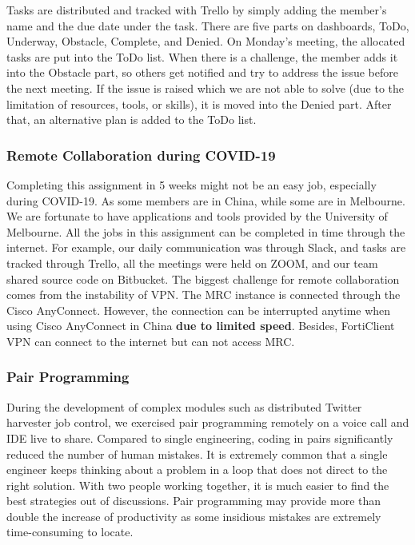 Tasks are distributed and tracked with Trello by simply adding the member's name and the due date under the task. There are five parts on dashboards, ToDo, Underway, Obstacle, Complete, and Denied. On Monday’s meeting, the allocated tasks are put into the ToDo list. When there is a challenge, the member adds it into the Obstacle part, so others get notified and try to address the issue before the next meeting. If the issue is raised which we are not able to solve (due to the limitation of resources, tools, or skills), it is moved into the Denied part. After that, an alternative plan is added to the ToDo list.

\subsubsection{Remote Collaboration during COVID-19}

Completing this assignment in 5 weeks might not be an easy job, especially during COVID-19. As some members are in China, while some are in Melbourne. We are fortunate to have applications and tools provided by the University of Melbourne. All the jobs in this assignment can be completed in time through the internet. For example, our daily communication was through Slack, and tasks are tracked through Trello, all the meetings were held on ZOOM, and our team shared source code on Bitbucket. The biggest challenge for remote collaboration comes from the instability of VPN. The MRC instance is connected through the Cisco AnyConnect. However, the connection can be interrupted anytime when using Cisco AnyConnect in China \textbf{due to limited speed}. Besides, FortiClient VPN can connect to the internet but can not access MRC.

\subsubsection{Pair Programming}

During the development of complex modules such as distributed Twitter harvester job control, we exercised pair programming remotely on a voice call and IDE live to share. Compared to single engineering, coding in pairs significantly reduced the number of human mistakes. It is extremely common that a single engineer keeps thinking about a problem in a loop that does not direct to the right solution. With two people working together, it is much easier to find the best strategies out of discussions. Pair programming may provide more than double the increase of productivity as some insidious mistakes are extremely time-consuming to locate. 

